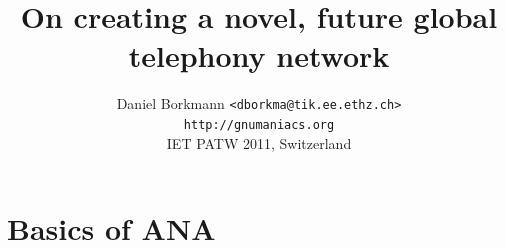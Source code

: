 \documentclass[black,white]{beamer}
\begin{document}
\title[netyack / the telephony network]{\huge{On creating a novel, future
					      global telephony network}}
\author[Daniel Borkmann] {
	\vspace*{-20pt}
	\newline
	Daniel Borkmann	\texttt{<dborkma@tik.ee.ethz.ch>}\\
	\texttt{http://gnumaniacs.org}\\\bigskip
	IET PATW 2011, Switzerland
}
\date[\today]{}

\frame {
	\titlepage
}


\section{Basics of ANA}
\frame {
	\frametitle{\textcolor{red2}{ETH Zurich}}
}
\end{document}

